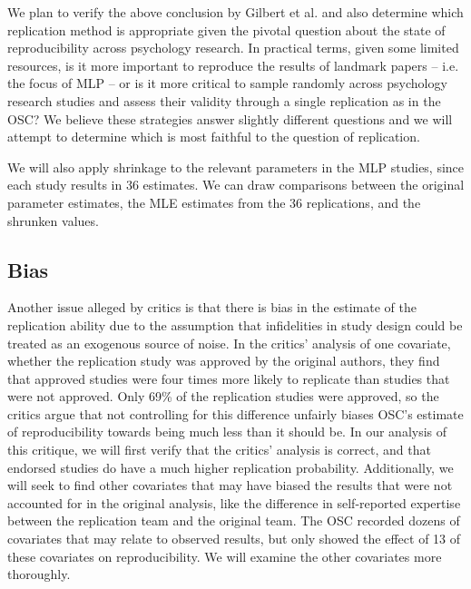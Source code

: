 \documentclass{article}
\begin{document}
We plan to verify the above conclusion by Gilbert et al. and also determine which replication method is appropriate given the pivotal question about the state of reproducibility across psychology research. In practical terms, given some limited resources, is it more important to reproduce the results of landmark papers -- i.e. the focus of MLP -- or is it more critical to sample randomly across psychology research studies and assess their validity through a single replication as in the OSC? We believe these strategies answer slightly different questions and we will attempt to determine which is most faithful to the question of replication. 

We will also apply shrinkage to the relevant parameters in the MLP studies, since each study results in 36 estimates. We can draw comparisons between the original parameter estimates, the MLE estimates from the 36 replications, and the shrunken values.


\subsection{Bias}
Another issue alleged by critics is that there is bias in the estimate of the replication ability due to the assumption that infidelities in study design could be treated as an exogenous source of noise. In the critics' analysis of one covariate, whether the replication study was approved by the original authors, they find that approved studies were four times more likely to replicate than studies that were not approved. Only 69\% of the replication studies were approved, so the critics argue that not controlling for this difference unfairly biases OSC's estimate of reproducibility towards being much less than it should be. In our analysis of this critique, we will first verify that the critics' analysis is correct, and that endorsed studies do have a much higher replication probability. Additionally, we will seek to find other covariates that may have biased the results that were not accounted for in the original analysis, like the difference in self-reported expertise between the replication team and the original team. The OSC recorded dozens of covariates that may relate to observed results, but only showed the effect of 13 of these covariates on reproducibility. We will examine the other covariates more thoroughly.


% 
% 
\end{document}
